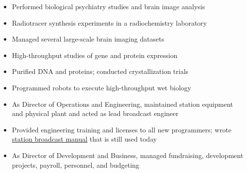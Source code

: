 \documentclass[10pt,a4paper]{altacv}
\begin{document}

\clearpage


\begin{itemize}
\item Performed biological psychiatry studies and brain image analysis
\item Radiotracer synthesis experiments in a radiochemistry laboratory  
\item Managed several large-scale brain imaging datasets
\end{itemize}

\divider



\begin{itemize}
\item High-throughput studies of gene and protein expression
\item Purified DNA and proteins; conducted crystallization trials
\item Programmed robots to execute high-throughput wet biology
\end{itemize}

\divider

\begin{itemize}
\item As Director of Operations and Engineering, maintained station equipment and physical plant and acted as lead broadcast engineer
\item Provided engineering training and licenses to all new programmers; wrote 
\href{https://www.cc-seas.columbia.edu/wkcr/bluebook.html}{station broadcast manual} that is still used today
\item As Director of Development and Business, managed fundraising, development projects, payroll, personnel, and budgeting
\end{itemize}
\end{document}
